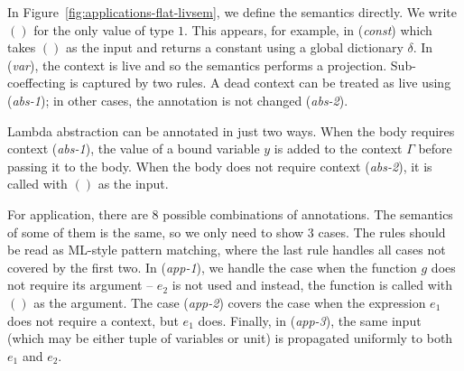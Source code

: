 In Figure~\ref{fig:applications-flat-livsem}, we define the semantics directly. We write $()$ for
the only value of type $1$. This appears, for example, in (\emph{const}) which takes $()$ as the
input and returns a constant using a global dictionary $\delta$. In (\emph{var}), the context is live
and so the semantics performs a projection. Sub-coeffecting is captured by two rules. A dead context 
can be treated as live using (\emph{abs-1}); in other cases, the annotation is not changed (\emph{abs-2}).

Lambda abstraction can be annotated in just two ways. When the body requires context (\emph{abs-1}),
the value of a bound variable $y$ is added to the context $\Gamma$ before passing it to the body.
When the body does not require context (\emph{abs-2}), it is called with $()$ as the input.

For application, there are 8 possible combinations of annotations. The semantics of some of them
is the same, so we only need to show 3 cases. The rules should be read as ML-style pattern matching,
where the last rule handles all cases not covered by the first two. In (\emph{app-1}), we handle the
case when the function $g$ does not require its argument -- $e_2$ is not used and instead, the function
is called with $()$ as the argument. The case (\emph{app-2}) covers the case when the expression
$e_1$ does not require a context, but $e_1$ does. Finally, in (\emph{app-3}), the same input
(which may be either tuple of variables or unit) is propagated uniformly to both $e_1$ and $e_2$.


